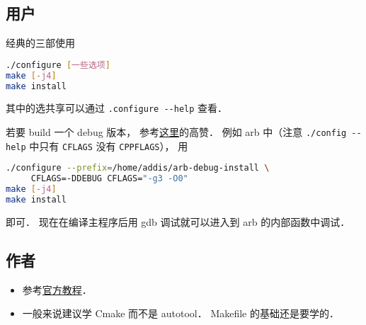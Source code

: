
\begin{issues}
\issueDraft
\end{issues}



\subsection{用户}
经典的三部使用
\begin{lstlisting}[language=bash]
./configure [一些选项]
make [-j4]
make install
\end{lstlisting}
其中的选共享可以通过 \verb|.configure --help| 查看．

若要 build 一个 debug 版本， 参考\href{https://stackoverflow.com/questions/4553735/gnu-autotools-debug-release-targets}{这里}的高赞． 例如 arb 中（注意 \verb|./config --help| 中只有 \verb|CFLAGS| 没有 \verb|CPPFLAGS|）， 用
\begin{lstlisting}[language=bash]
./configure --prefix=/home/addis/arb-debug-install \
     CFLAGS=-DDEBUG CFLAGS="-g3 -O0"
make [-j4]
make install
\end{lstlisting}
即可． 现在在编译主程序后用 gdb 调试就可以进入到 arb 的内部函数中调试．

\subsection{作者}
\begin{itemize}
\item 参考\href{https://www.gnu.org/software/automake/manual/html_node/Autotools-Introduction.html}{官方教程}．
\item 一般来说建议学 Cmake\upref{CMakeN} 而不是 autotool． Makefile 的基础还是要学的．
\end{itemize}

